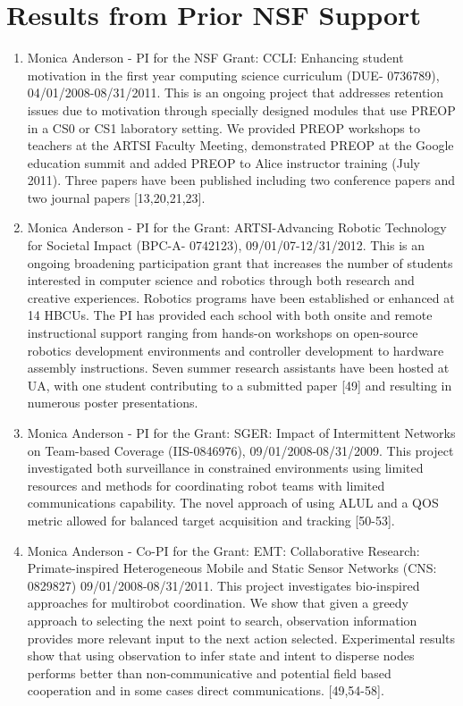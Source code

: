 
\section{Results from Prior NSF Support}\label{sec:prior-nsf}
\begin{enumerate}
\item Monica Anderson  - PI for the NSF Grant: CCLI: Enhancing student motivation in the first year computing science curriculum (DUE- 0736789), 04/01/2008-08/31/2011.  This is an ongoing project that addresses retention issues due to motivation through specially designed modules that use PREOP in a CS0 or CS1 laboratory setting.  We provided PREOP workshops to teachers at the ARTSI Faculty Meeting, demonstrated PREOP at the Google education summit and added PREOP to Alice instructor training (July 2011). Three papers have been published including two conference papers and two journal papers [13,20,21,23]. 
\item Monica Anderson  - PI for the Grant: ARTSI-Advancing Robotic Technology for Societal Impact (BPC-A- 0742123), 09/01/07-12/31/2012. This is an ongoing broadening participation grant that increases the number of students interested in computer science and robotics through both research and creative experiences. Robotics programs have been established or enhanced at 14 HBCUs. The PI has provided each school with both onsite and remote instructional support ranging from hands-on workshops on open-source robotics development environments and controller development to hardware assembly instructions. Seven summer research assistants have been hosted at UA, with one student contributing to a submitted paper [49] and resulting in numerous poster presentations. 
\item Monica Anderson  - PI for the Grant: SGER: Impact of Intermittent Networks on Team-based Coverage (IIS-0846976), 09/01/2008-08/31/2009. This project investigated both surveillance in constrained environments using limited resources and methods for coordinating robot teams with limited communications capability. The novel approach of using ALUL and a QOS metric allowed for balanced target acquisition and tracking [50-53].
\item Monica Anderson  - Co-PI for the Grant: EMT: Collaborative Research: Primate-inspired Heterogeneous Mobile and Static Sensor Networks (CNS: 0829827) 09/01/2008-08/31/2011. This project investigates bio-inspired approaches for multirobot coordination. We show that given a greedy approach to selecting the next point to search, observation information provides more relevant input to the next action selected. Experimental results show that using observation to infer state and intent to disperse nodes performs better than non-communicative and potential field based cooperation and in some cases direct communications. [49,54-58]. 

\end{enumerate}
